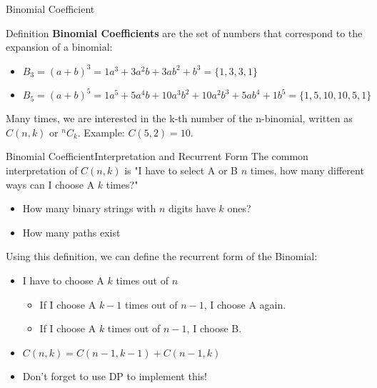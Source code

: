 
\begin{frame}{Binomial Coefficient}
  \begin{block}{Definition}
    {\bf Binomial Coefficients} are the set of numbers that correspond to the expansion of a binomial:\bigskip

    \begin{itemize}
      \item $B_3 = (a+b)^3 = 1a^3 + 3a^2b + 3ab^2 + b^3 = \{1,3,3,1\}$
      \item $B_5 = (a+b)^5 = 1a^5 + 5a^4b + 10a^3b^2 + 10a^2b^3 + 5ab^4 + 1b^5 = \{1,5,10,10,5,1\}$
    \end{itemize}\bigskip

    Many times, we are interested in the k-th number of the n-binomial, written as $C(n,k)$ or $^nC_k$. Example: $C(5,2) = 10$.
  \end{block}
\end{frame}

\begin{frame}[fragile]{Binomial Coefficient}{Interpretation and Recurrent Form}
  The common interpretation of $C(n,k)$ is "I have to select A or B $n$ times, how many different ways can I choose A $k$ times?"
  \begin{itemize}
    \item How many binary strings with $n$ digits have $k$ ones?
    \item How many paths exist
  \end{itemize}\bigskip

  Using this definition, we can define the recurrent form of the Binomial:
  \begin{itemize}
    \item I have to choose A $k$ times out of $n$
    \begin{itemize}
      \item If I choose A $k-1$ times out of $n-1$, I choose A again.
      \item If I choose A $k$ times out of $n-1$, I choose B.
    \end{itemize}
    \item $C(n,k) = C(n-1,k-1) + C(n-1,k)$
    \item Don't forget to use DP to implement this!
  \end{itemize}\bigskip
\end{frame}

